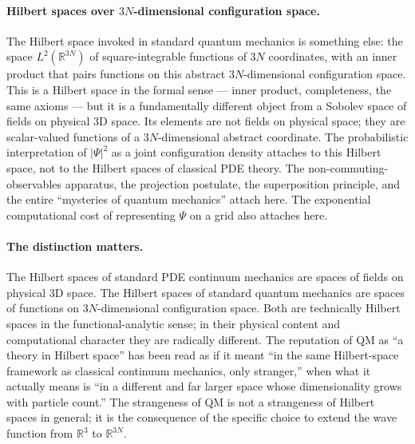 \paragraph{Hilbert spaces over \texorpdfstring{$3N$}{3N}-dimensional configuration space.}
The Hilbert space invoked in standard quantum mechanics is something else: the space $L^2(\mathbb{R}^{3N})$ of square-integrable functions of $3N$ coordinates, with an inner product that pairs functions on this abstract $3N$-dimensional configuration space. This is a Hilbert space in the formal sense --- inner product, completeness, the same axioms --- but it is a fundamentally different object from a Sobolev space of fields on physical 3D space. Its elements are not fields on physical space; they are scalar-valued functions of a $3N$-dimensional abstract coordinate. The probabilistic interpretation of $|\Psi|^2$ as a joint configuration density attaches to this Hilbert space, not to the Hilbert spaces of classical PDE theory. The non-commuting-observables apparatus, the projection postulate, the superposition principle, and the entire ``mysteries of quantum mechanics'' attach here. The exponential computational cost of representing $\Psi$ on a grid also attaches here.

\paragraph{The distinction matters.}
The Hilbert spaces of standard PDE continuum mechanics are spaces of fields on physical 3D space. The Hilbert spaces of standard quantum mechanics are spaces of functions on $3N$-dimensional configuration space. Both are technically Hilbert spaces in the functional-analytic sense; in their physical content and computational character they are radically different. The reputation of QM as ``a theory in Hilbert space'' has been read as if it meant ``in the same Hilbert-space framework as classical continuum mechanics, only stranger,'' when what it actually means is ``in a different and far larger space whose dimensionality grows with particle count.'' The strangeness of QM is not a strangeness of Hilbert spaces in general; it is the consequence of the specific choice to extend the wave function from $\mathbb{R}^3$ to $\mathbb{R}^{3N}$.

